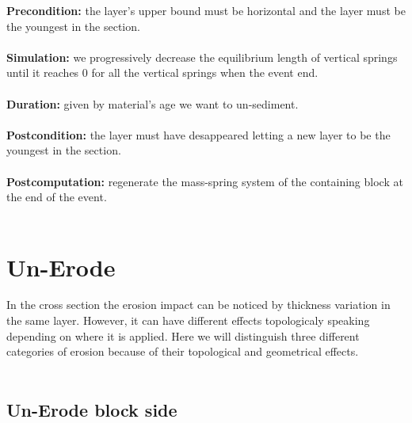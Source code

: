 \documentclass[12pt, a4paper]{memoir} %
\begin{document}
\textbf{Precondition:} the layer's upper bound must be horizontal and the layer must be the youngest in the section.\\\\
\textbf{Simulation:} we progressively decrease the equilibrium length of vertical springs until it reaches $0$ for all the vertical springs when the event end.\\\\
\textbf{Duration:} given by material's age we want to un-sediment.\\\\
\textbf{Postcondition:} the layer must have desappeared letting a new layer to be the youngest 
in the section.\\\\
\textbf{Postcomputation:} regenerate the mass-spring system of the containing block at the end of the event.\\\\

\section{Un-Erode}

In the cross section the erosion impact can be noticed by thickness variation in the same layer. However, it can have different effects topologicaly speaking depending on where it is applied. Here we will distinguish three different categories of erosion because of their topological and geometrical effects.\\\\

\subsection{Un-Erode block side}
\end{document}
